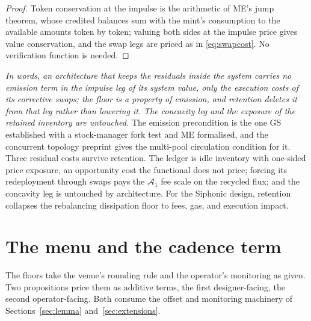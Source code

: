 \documentclass[11pt,a4paper]{article}
\theoremstyle{definition}
\theoremstyle{plain}
\theoremstyle{remark}
\begin{document}
\begin{proof}
Token conservation at the impulse is the arithmetic of ME's jump theorem, whose credited balances sum with the mint's consumption to the available amounts token by token; valuing 
both sides at the impulse price gives value conservation, and the swap legs are priced as in \eqref{eq:swapcost}. No verification function is needed.
\end{proof}

\emph{In words, an architecture that keeps the residuals inside the system carries no emission term in the impulse leg of its system value, only the execution costs of its corrective 
swaps; the floor is a property of emission, and retention deletes it from that leg rather than lowering it. The concavity leg and the exposure of the retained inventory are untouched.} 
The emission precondition is the one GS established with a stock-manager fork test and ME formalised, and the concurrent topology preprint\cite{pi2026convexity} gives the multi-pool circulation 
condition for it. Three residual costs survive retention. The ledger is idle inventory with one-sided price exposure, an opportunity cost the functional does not price; forcing its redeployment 
through swaps pays the $\mathcal{A}_1$ fee scale on the recycled flux; and the concavity leg is untouched by architecture. For the Siphonic design, retention collapses the rebalancing dissipation 
floor to fees, gas, and execution impact.

\section{The menu and the cadence term}\label{sec:menu}

The floors take the venue's rounding rule and the operator's monitoring as given. Two propositions price them as additive terms, the first designer-facing, the second operator-facing. Both consume 
the offset and monitoring machinery of Sections~\ref{sec:lemma} and~\ref{sec:extensions}.
\end{document}
